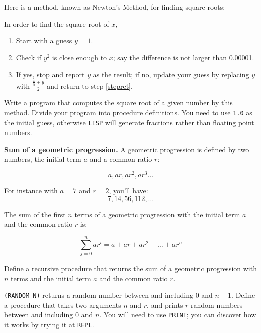 \documentclass[a4paper,11pt]{article}
\begin{document}
\begin{uexercise}

Here is a method, known as Newton's Method, for finding square roots:  

In order to find the square root of $x$,

\begin{enumerate}
\item Start with a guess $y=1$.
\item\label{stepret} Check if $y^2$ is close enough to $x$; say the difference is not larger than 0.00001.
\item If yes, stop and report $y$ as the result; if no, update your guess by replacing $y$ with $\frac{\frac{x}{y} + y}{2}$ and return to step \ref{stepret}. 
\end{enumerate}

Write a program that computes the square root of a given number by this method. Divide your program into procedure definitions. You need to use \Verb+1.0+ as the initial guess, otherwise \Verb+LISP+ will generate fractions rather than floating point numbers. 

\end{uexercise}

\begin{uexercise}

{\bf Sum of a geometric progression.} A geometric progression is defined by two numbers, the initial term $a$ and a common ratio $r$:  

	$$
	a, ar, ar^2, ar^3\ldots	
		$$	

		For instance with $a=7$ and $r=2$, you'll have: 
	$$
		7, 14, 56, 112,\ldots 	
		$$	
	
		The sum of the first $n$ terms of a geometric progression with the initial term $a$ and the common ratio $r$ is:


$$
		\sum_{j=0}^{n} ar^i = a + ar + ar^2 + \ldots + ar^n
		$$


Define a recursive procedure that returns the sum of a geometric progression with $n$ terms and the initial term $a$ and the common ratio $r$.

\end{uexercise}

\begin{uexercise}
\Verb+(RANDOM N)+ returns a random number between and including $0$ and $n-1$. Define a procedure that takes two arguments $n$ and $r$, and prints $r$ random numbers between and including $0$ and $n$. You will need to use \Verb+PRINT+; you can discover how it works by trying it at \Verb+REPL+.


\end{uexercise}
\end{document}
